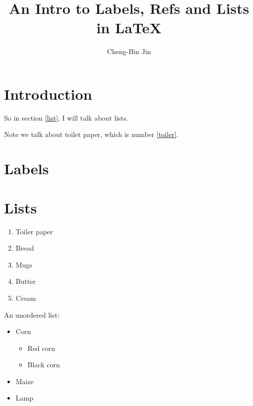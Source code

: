 \documentclass{article}
\author{Cheng-Bin Jin}
\title{An Intro to Labels, Refs and Lists in {\LaTeX}}
\begin{document}
\maketitle

\section{Introduction}
So in section \ref{list}, I will talk about lists.

Note we talk about toilet paper, which is number \ref{toiler}.

\section{Labels}

\section{Lists\label{list}}

\begin{enumerate}
\item Toiler paper \label{toiler}
\item Bread
\item Mugs
\item Butter
\item Cream
\end{enumerate}

An unordered list:

\begin{itemize}
\item Corn
\begin{itemize}
\item Red corn
\item Black corn
\end{itemize}
\item Maize
\item Lamp
\end{itemize}
\end{document}

